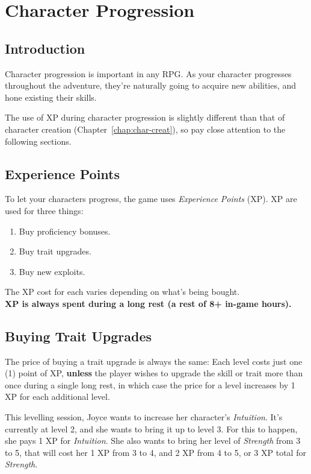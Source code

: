\chapter{Character Progression}\label{chap:char-prog}
\section{Introduction}
Character progression is important in any RPG.
As your character progresses throughout the adventure, they're naturally going to acquire new abilities, and hone existing their skills.

\begin{note} 
  The use of XP during character progression is slightly different than that of character creation (Chapter~\ref{chap:char-creat}), so pay close attention to the following sections.
\end{note}

\section{Experience Points}
To let your characters progress, the game uses \textit{Experience Points} (XP).
XP are used for three things:
\begin{enumerate}
\item Buy proficiency bonuses.
\item Buy trait upgrades.
\item Buy new exploits.
\end{enumerate}
The XP cost for each varies depending on what's being bought.\\
\textbf{XP is always spent during a long rest (a rest of 8+ in-game hours).}

\section{Buying Trait Upgrades}
The price of buying a trait upgrade is always the same:
Each level costs just one (1) point of XP, \textbf{unless} the player wishes to upgrade the skill or trait more than once during a single long rest, in which case the price for a level increases by 1 XP for each additional level.

\begin{example}
This levelling session, Joyce wants to increase her character's \textit{Intuition}. 
It's currently at level 2, and she wants to bring it up to level 3.
For this to happen, she pays 1 XP for \textit{Intuition}.
She also wants to bring her level of \textit{Strength} from 3 to 5, that will cost her 1 XP from 3 to 4, and 2 XP from 4 to 5, or 3 XP total for \textit{Strength}.
\end{example}

